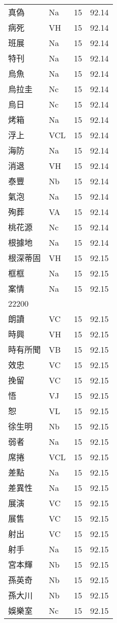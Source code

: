 \documentclass[twocolumn]{book}
\begin{document}
\begin{supertabular}{llrr}
真偽 & Na & 15 &  92.14\\
病死 & VH & 15 &  92.14\\
班展 & Na & 15 &  92.14\\
特刊 & Na & 15 &  92.14\\
烏魚 & Na & 15 &  92.14\\
烏拉圭 & Nc & 15 &  92.14\\
烏日 & Nc & 15 &  92.14\\
烤箱 & Na & 15 &  92.14\\
浮上 & VCL & 15 &  92.14\\
海防 & Na & 15 &  92.14\\
消退 & VH & 15 &  92.14\\
泰豐 & Nb & 15 &  92.14\\
氣泡 & Na & 15 &  92.14\\
殉葬 & VA & 15 &  92.14\\
桃花源 & Nc & 15 &  92.14\\
根據地 & Na & 15 &  92.14\\
根深蒂固 & VH & 15 &  92.15\\
框框 & Na & 15 &  92.15\\
案情 & Na & 15 &  92.15\\
22200\\
朗讀 & VC & 15 &  92.15\\
時興 & VH & 15 &  92.15\\
時有所聞 & VB & 15 &  92.15\\
效忠 & VC & 15 &  92.15\\
挽留 & VC & 15 &  92.15\\
悟 & VJ & 15 &  92.15\\
恕 & VL & 15 &  92.15\\
徐生明 & Nb & 15 &  92.15\\
弱者 & Na & 15 &  92.15\\
席捲 & VCL & 15 &  92.15\\
差點 & Na & 15 &  92.15\\
差異性 & Na & 15 &  92.15\\
展演 & VC & 15 &  92.15\\
展售 & VC & 15 &  92.15\\
射出 & VC & 15 &  92.15\\
射手 & Na & 15 &  92.15\\
宮本輝 & Nb & 15 &  92.15\\
孫英奇 & Nb & 15 &  92.15\\
孫大川 & Nb & 15 &  92.15\\
娛樂室 & Nc & 15 &  92.15\\

\end{supertabular}
\end{document}
